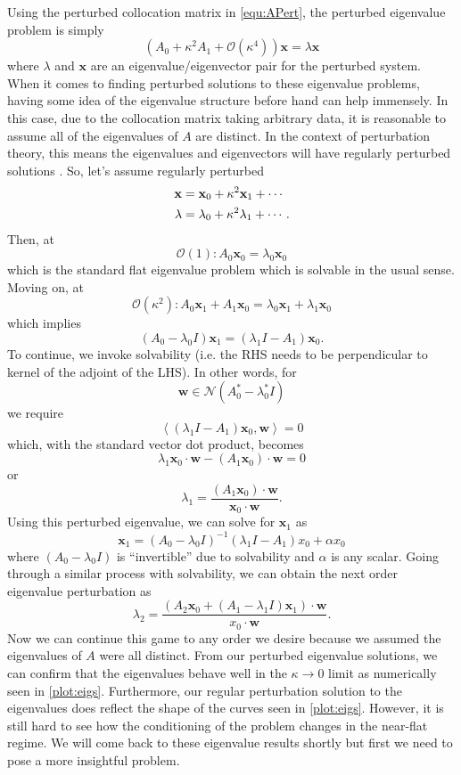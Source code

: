 \documentclass[a4paper,11pt]{article}
\newcommand{\nul}{\mathcal{N}}
\newcommand{\inner}[1]{\left\langle #1 \right\rangle}
\newcommand{\bigO}{\mathcal{O}}
\newcommand{\bx}{\mathbf{x}}
\begin{document}
Using the perturbed collocation matrix in \eqref{equ:APert}, the perturbed eigenvalue problem is simply
\[
	(A_0 + \kappa^2 A_1 + \bigO(\kappa^4)) \bx = \lambda \bx
\]
where $ \lambda $ and $ \bx $ are an eigenvalue/eigenvector pair for the perturbed system. When it comes to finding perturbed solutions to these eigenvalue problems, having some idea of the eigenvalue structure before hand can help immensely. In this case, due to the collocation matrix taking arbitrary data, it is reasonable to assume all of the eigenvalues of $ A $ are distinct. In the context of perturbation theory, this means the eigenvalues and eigenvectors will have regularly perturbed solutions \cite{hinch}. So, let's assume regularly perturbed
\begin{align}
	\bx &= \bx_0 + \kappa^2 \bx_1 + \cdots \notag \\
	\lambda &= \lambda_0 + \kappa^2 \lambda_1 + \cdots. \label{equ:eigs}
\end{align}
Then, at 
\begin{equation}
	\bigO(1): A_0 \bx_0 = \lambda_0 \bx_0 \label{equ:l0}
\end{equation}
which is the standard flat eigenvalue problem which is solvable in the usual sense. Moving on, at
\[
	\bigO(\kappa^2): A_0 \bx_1 + A_1 \bx_0 = \lambda_0 \bx_1 + \lambda_1 \bx_0
\]
which implies
\[
	(A_0 - \lambda_0 I) \bx_1 = (\lambda_1I - A_1) \bx_0.
\]
To continue, we invoke solvability (i.e. the RHS needs to be perpendicular to kernel of the adjoint of the LHS). In other words, for 
\[
	\mathbf{w} \in \nul(A_0^* - \lambda_0^*I)
\]
we require
\[
	\inner{(\lambda_1I - A_1) \bx_0, \mathbf{w}} = 0
\]
which, with the standard vector dot product, becomes
\[
	\lambda_1 \bx_0 \cdot \mathbf{w} - (A_1 \bx_0) \cdot \mathbf{w} = 0
\]
or
\begin{equation}
	\lambda_1 = \frac{(A_1 \bx_0) \cdot \mathbf{w}}{\bx_0 \cdot \mathbf{w}}. \label{equ:l1}
\end{equation}
Using this perturbed eigenvalue, we can solve for $ \bx_1 $ as
\[
	\bx_1 = (A_0 - \lambda_0 I)^{-1} (\lambda_1 I - A_1) x_0 + \alpha x_0
\]
where $ (A_0 - \lambda_0 I) $ is ``invertible'' due to solvability and $ \alpha $ is any scalar. Going through a similar process with solvability, we can obtain the next order eigenvalue  perturbation as
\begin{equation}
	\lambda_2 = \frac{(A_2 \bx_0 + (A_1 - \lambda_1 I)\bx_1) \cdot \mathbf{w}}{x_0 \cdot \mathbf{w}}. \label{equ:l2}
\end{equation}
Now we can continue this game to any order we desire because we assumed the eigenvalues of $ A $ were all distinct. From our perturbed eigenvalue solutions, we can confirm that the eigenvalues behave well in the $ \kappa \to 0 $ limit as numerically seen in \autoref{plot:eigs}. Furthermore, our regular perturbation solution to the eigenvalues does reflect the shape of the curves seen in \autoref{plot:eigs}. However, it is still hard to see how the conditioning of the problem changes in the near-flat regime. We will come back to these eigenvalue results shortly but first we need to pose a more insightful problem.
\end{document}
